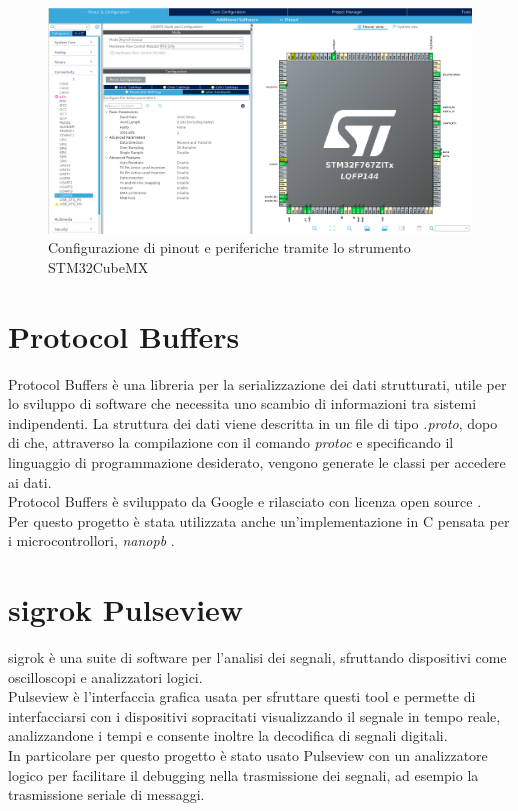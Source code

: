 \begin{figure}[H]
\centering
\includegraphics[scale=0.25]{images/stm32cubemx.png}
\caption{Configurazione di pinout e periferiche tramite lo strumento STM32CubeMX}
\end{figure}

\section{Protocol Buffers}
Protocol Buffers è una libreria per la serializzazione dei dati strutturati, utile per lo sviluppo di software che necessita uno scambio di informazioni tra sistemi indipendenti.
La struttura dei dati viene descritta in un file di tipo \textit{.proto}, dopo di che, attraverso la compilazione con il comando \textit{protoc} e specificando il linguaggio di programmazione desiderato, vengono generate le classi per accedere ai dati. \\


                
Protocol Buffers è sviluppato da Google e rilasciato con licenza open source \cite{ProtocolBuffers}. \\
Per questo progetto è stata utilizzata anche un'implementazione in C pensata per i microcontrollori, \textit{nanopb} \cite{nanopb}.

\section{sigrok Pulseview}
sigrok è una suite di software per l'analisi dei segnali, sfruttando dispositivi come oscilloscopi e analizzatori logici. \\
Pulseview è l'interfaccia grafica usata per sfruttare questi tool e permette di interfacciarsi con i dispositivi sopracitati visualizzando il segnale in tempo reale, analizzandone i tempi e consente inoltre la decodifica di segnali digitali. \\
In particolare per questo progetto è stato usato Pulseview con un analizzatore logico per facilitare il debugging nella trasmissione dei segnali, ad esempio la trasmissione seriale di messaggi.

